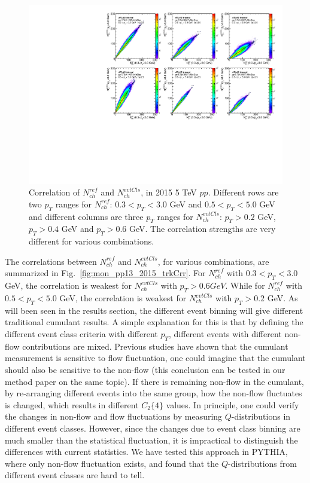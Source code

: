 \begin{figure}[H]
\centering
\includegraphics[width=1.\linewidth]{figs/sec_ana/mon_pp5_2015_trkCrr.pdf}
\caption{Correlation of $N_{ch}^{ref}$ and $N_{ch}^{evtCls}$, in 2015 5 TeV $pp$. Different rows are two $p_{T}$ ranges for $N_{ch}^{ref}$: $0.3<p_{T}<3.0$ GeV and $0.5<p_{T}<5.0$ GeV and different columns are three $p_{T}$ ranges for $N_{ch}^{evtCls}$: $p_{T}>0.2$ GeV, $p_{T}>0.4$ GeV and $p_{T}>0.6$ GeV. The correlation strengths are very different for various combinations.}
\label{fig:mon_pp5_2015_trkCrr}
\end{figure}

The correlations between $N_{ch}^{ref}$ and $N_{ch}^{evtCls}$, for various combinations, are summarized in Fig.~\ref{fig:mon_pp13_2015_trkCrr}. For $N_{ch}^{ref}$ with $0.3<p_{T}<3.0$ GeV, the correlation is weakest for $N_{ch}^{evtCls}$ with $p_{T}>0.6 GeV$. While for $N_{ch}^{ref}$ with $0.5<p_{T}<5.0$ GeV, the correlation is weakest for $N_{ch}^{evtCls}$ with $p_{T}>0.2$ GeV. As will been seen in the results section, the different event binning will give different traditional cumulant results. A simple explanation for this is that by defining the different event class criteria with different $p_{T}$, different events with different non-flow contributions are mixed. Previous studies have shown that the cumulant measurement is sensitive to flow fluctuation, one could imagine that the cumulant should also be sensitive to the non-flow (this conclusion can be tested in our method paper on the same topic). If there is remaining non-flow in the cumulant, by re-arranging different events into the same group, how the non-flow fluctuates is changed, which results in different $C_{2}\{4\}$ values. In principle, one could verify the changes in non-flow and flow fluctuations by measuring $Q$-distributions in different event classes. However, since the changes due to event class binning are much smaller than the statistical fluctuation, it is impractical to distinguish the differences with current statistics. We have tested this approach in PYTHIA, where only non-flow fluctuation exists, and found that the $Q$-distributions from different event classes are hard to tell.

